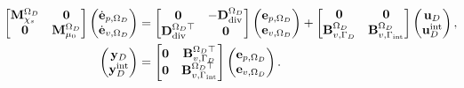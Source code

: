\begin{tcolorbox}[colframe=blue,title=Subdomain $\Omega_D$,  coltitle=white]%
	\begin{equation}\label{eq:pHfindim_waves_OmD}
	\hspace*{-0.3cm}
	\begin{aligned}
	\begin{bmatrix}
	\mathbf{M}_{\chi_s}^{\Omega_D} & \mathbf{0} \\
	\mathbf{0} & \mathbf{M}_{\mu_0}^{\Omega_D} \\
	\end{bmatrix}
	\begin{pmatrix}
	\dot{\mathbf{e}}_{p, \Omega_D} \\
	\dot{\mathbf{e}}_{v, \Omega_D} \\
	\end{pmatrix}
	&= \begin{bmatrix}
	\mathbf{0} & -\mathbf{D}_{\div}^{\Omega_D}\\
	\mathbf{D}_{\div}^{\Omega_D \top} & \mathbf{0}\\
	\end{bmatrix}
	\begin{pmatrix}
	{\mathbf{e}}_{p, \Omega_D}\\
	{\mathbf{e}}_{v, \Omega_D}\\
	\end{pmatrix} + \begin{bmatrix}
	\mathbf{0} & \mathbf{0}\\
	\mathbf{B}_{v, \Gamma_{D}}^{\Omega_D} & \mathbf{B}_{v, \Gamma_{\text{int}}}^{\Omega_D}\\
	\end{bmatrix}
	\begin{pmatrix}
	\mathbf{u}_D \\
	\mathbf{u}_D^{\text{int}}
	\end{pmatrix}, \\
	\begin{pmatrix}
	\mathbf{y}_D \\
	\mathbf{y}_D^{\text{int}}
	\end{pmatrix} &=
	\begin{bmatrix}
	\mathbf{0} & \mathbf{B}_{v, \Gamma_{D}}^{\Omega_D \top} \\ 
	\mathbf{0} & \mathbf{B}_{v, \Gamma_{\text{int}}}^{\Omega_D \top} \\ 
	\end{bmatrix}
	\begin{pmatrix}
	{\mathbf{e}}_{p, \Omega_D} \\
	{\mathbf{e}}_{v, \Omega_D} \\
	\end{pmatrix}.
	\end{aligned}	
	\end{equation}
\end{tcolorbox} 
